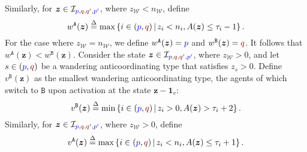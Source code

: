 \documentclass[10 pt,twocolumn,journal]{IEEEtran}
\theoremstyle{plain}
\newcommand{\db}{\overset{\Delta}{=}}
\newcommand{\A}{\mathcal{A}}
\newcommand{\I}{\mathcal{I}}
\newcommand{\W}{\mathcal{W}}
\newcommand{\x}{\bm{x}}
\newcommand{\z}{\bm{z}}
\newcommand{\p}{\tb{p}}
\newcommand{\pp}{\tb{p'}}
\newcommand{\q}{\tr{q}}
\newcommand{\qq}{\tr{q'}}
\renewcommand{\A}{\mathtt{A}}
\newcommand{\B}{\mathtt{B}}
\newcommand{\tb}{\textcolor{blue}}
\newcommand{\tr}{\textcolor{Myred}}
\theoremstyle{definition}
\begin{document}
Similarly, for $\z\in\I_{\p,\q,\qq,\pp}$, where $z_\W<n_\W$, define 
\begin{equation*}
    w^{\A}(\z) \db
    \max\left\{i\in(\p,\q) \,|\, z_i<n_i,
    A(\z) \leq {\tau_{i}}-1
    \right\}.
\end{equation*}
For the case where $z_\W=n_\W$,
we define $w^{\A}(\z) = \p$ and $w^{\B}(\z) = \q$.
It follows that $w^{\A}(\z) < w^{\B}(\z)$. 
Consider the state $\z\in\I_{\p,\q,\qq,\pp}$, where $z_\W>0$, and let $s\in(\p,\q)$ be a wandering anticoordinating type that satisfies $z_s>0$.
Define $v^{\B}(\z)$ as the smallest wandering anticoordinating type, the agents of which switch to $\B$ upon activation at the state $\z-\bm{1}_v$:
\begin{equation*}
    v^{\B}(\z) \db
    \min\left\{i\in(\p,\q) \,|\, z_i>0,
    A(\z) > {\tau_{i}}+2
    \right\}.
\end{equation*}
Similarly, for $\z\in\I_{\p,\q,\qq,\pp}$, where $z_\W>0$, define 
\begin{equation*}
    v^{\A}(\z) \db
    \max\left\{i\in(\p,\q) \,|\, z_i<n_i,
    A(\z) \leq {\tau_{i}}+1
    \right\}.
\end{equation*}
\end{document}
